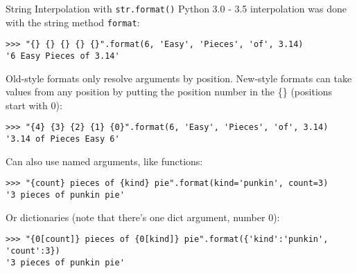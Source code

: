 \documentclass[smaller, aspectratio=1610]{beamer}
\begin{document}
\begin{frame}[label={sec:org12ca6ae},fragile]{String Interpolation with \texttt{str.format()}}
 Python 3.0 - 3.5 interpolation was done with the string method \texttt{format}:

\lstset{language=Python,label= ,caption= ,captionpos=b,numbers=none}
\begin{lstlisting}
>>> "{} {} {} {} {}".format(6, 'Easy', 'Pieces', 'of', 3.14)
'6 Easy Pieces of 3.14'
\end{lstlisting}

Old-style formats only resolve arguments by position. New-style
formats can take values from any position by putting the position
number in the \{\} (positions start with 0):

\lstset{language=Python,label= ,caption= ,captionpos=b,numbers=none}
\begin{lstlisting}
>>> "{4} {3} {2} {1} {0}".format(6, 'Easy', 'Pieces', 'of', 3.14)
'3.14 of Pieces Easy 6'
\end{lstlisting}

Can also use named arguments, like functions:

\lstset{language=Python,label= ,caption= ,captionpos=b,numbers=none}
\begin{lstlisting}
>>> "{count} pieces of {kind} pie".format(kind='punkin', count=3)
'3 pieces of punkin pie'
\end{lstlisting}

Or dictionaries (note that there's one dict argument, number 0):

\lstset{language=Python,label= ,caption= ,captionpos=b,numbers=none}
\begin{lstlisting}
>>> "{0[count]} pieces of {0[kind]} pie".format({'kind':'punkin',
'count':3})
'3 pieces of punkin pie'
\end{lstlisting}
\end{frame}
\end{document}

